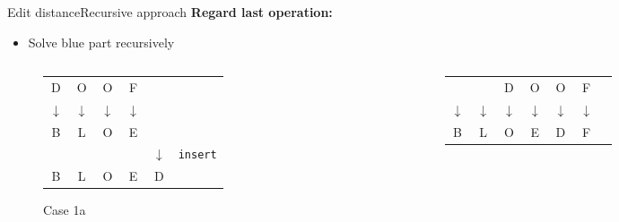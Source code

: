 
\begin{frame}{Edit distance}{Recursive approach}
  \textbf{Regard last operation:}
  \begin{itemize}
    \item<2->
      Solve {\color{Mittel-Blau}blue} part recursively
  \end{itemize}
  \begin{columns}[T]
    \begin{column}{0.3\linewidth}
      \begin{figure}[!h]
        \begin{center}
          \begin{tabular}{c@{}c@{}c@{}c@{}c@{}l}
            \color{Mittel-Blau}D & \color{Mittel-Blau}O & \color{Mittel-Blau}O &
            \color{Mittel-Blau}F\\
            \color{Mittel-Blau}$\downarrow$ & \color{Mittel-Blau}$\downarrow$ &
            \color{Mittel-Blau}$\downarrow$ & \color{Mittel-Blau}$\downarrow$\\
            \color{Mittel-Blau}B & \color{Mittel-Blau}L & \color{Mittel-Blau}O &
            \color{Mittel-Blau}E\\
            {} & {} & {} & {} & $\downarrow$ & \texttt{insert}\\
            B & L & O & E & D
          \end{tabular}
        \end{center}
        \caption{Case 1a}
      \end{figure}
    \end{column}
    \begin{column}{0.3\linewidth}
      \begin{figure}[!h]
        \begin{center}
          \begin{tabular}{c@{}c@{}c@{}c@{}c@{}c@{}l}
            {} & {} & \color{Mittel-Blau}D & \color{Mittel-Blau}O &
            \color{Mittel-Blau}O & \color{Mittel-Blau}F\\
            \color{Mittel-Blau}$\downarrow$ & \color{Mittel-Blau}$\downarrow$ &
            \color{Mittel-Blau}$\downarrow$ & \color{Mittel-Blau}$\downarrow$ &
            \color{Mittel-Blau}$\downarrow$ & \color{Mittel-Blau}$\downarrow$\\
            \color{Mittel-Blau}B & \color{Mittel-Blau}L & \color{Mittel-Blau}O &
            \color{Mittel-Blau}E & \color{Mittel-Blau}D & \color{Mittel-Blau}F\\

\end{tabular}
\end{center}
\end{figure}
\end{column}
\end{columns}
\end{frame}
